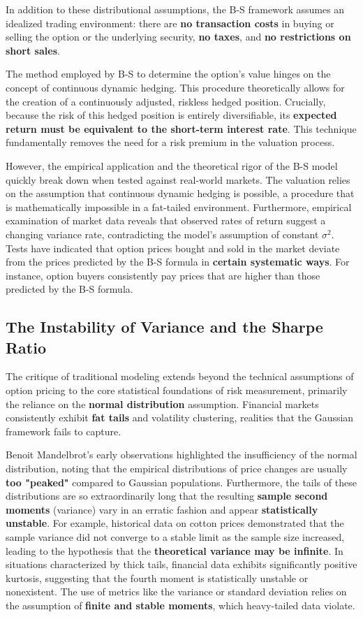 \documentclass{ieeetj}
\begin{document}
 In addition to these distributional assumptions, the B-S framework assumes an idealized trading environment: there are \textbf{no transaction costs} in buying or selling the option or the underlying security, \textbf{no taxes}, and \textbf{no restrictions on short sales}.

 The method employed by B-S to determine the option’s value hinges on the concept of continuous dynamic hedging. This procedure theoretically allows for the creation of a continuously adjusted, riskless hedged position. Crucially, because the risk of this hedged position is entirely diversifiable, its \textbf{expected return must be equivalent to the short-term interest rate}. This technique fundamentally removes the need for a risk premium in the valuation process.

 However, the empirical application and the theoretical rigor of the B-S model quickly break down when tested against real-world markets. The valuation relies on the assumption that continuous dynamic hedging is possible, a procedure that is mathematically impossible in a fat-tailed environment. Furthermore, empirical examination of market data reveals that observed rates of return suggest a changing variance rate, contradicting the model's assumption of constant $\sigma^2$. Tests have indicated that option prices bought and sold in the market deviate from the prices predicted by the B-S formula in\textbf{ certain systematic ways}. For instance, option buyers consistently pay prices that are higher than those predicted by the B-S formula.


\subsection{The Instability of Variance and the Sharpe Ratio}
The critique of traditional modeling extends beyond the technical assumptions of option pricing to the core statistical foundations of risk measurement, primarily the reliance on the \textbf{normal distribution} assumption. Financial markets consistently exhibit \textbf{fat tails} and volatility clustering, realities that the Gaussian framework fails to capture.

Benoit Mandelbrot’s early observations highlighted the insufficiency of the normal distribution, noting that the empirical distributions of price changes are usually\textbf{ too "peaked"} compared to Gaussian populations. Furthermore, the tails of these distributions are so extraordinarily long that the resulting \textbf{sample second moments} (variance) vary in an erratic fashion and appear \textbf{statistically unstable}. For example, historical data on cotton prices demonstrated that the sample variance did not converge to a stable limit as the sample size increased, leading to the hypothesis that the \textbf{theoretical variance may be infinite}. In situations characterized by thick tails, financial data exhibits significantly positive kurtosis, suggesting that the fourth moment is statistically unstable or nonexistent. The use of metrics like the variance or standard deviation relies on the assumption of \textbf{finite and stable moments}, which heavy-tailed data violate.
\end{document}
